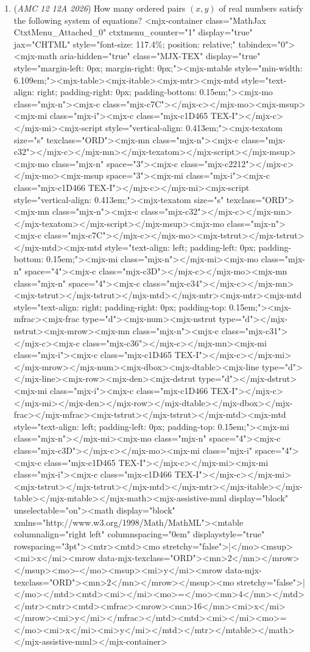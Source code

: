 \begin{enumerate}
	\item (\textit{AMC 12 12A 2026}) How many ordered pairs $(x,y)$ of real numbers satisfy the following system of equations?
<mjx-container class="MathJax CtxtMenu\_Attached\_0" ctxtmenu\_counter="1" display="true" jax="CHTML" style="font-size: 117.4\%; position: relative;" tabindex="0"><mjx-math aria-hidden="true" class="MJX-TEX" display="true" style="margin-left: 0px; margin-right: 0px;"><mjx-mtable style="min-width: 6.109em;"><mjx-table><mjx-itable><mjx-mtr><mjx-mtd style="text-align: right; padding-right: 0px; padding-bottom: 0.15em;"><mjx-mo class="mjx-n"><mjx-c class="mjx-c7C"></mjx-c></mjx-mo><mjx-msup><mjx-mi class="mjx-i"><mjx-c class="mjx-c1D465 TEX-I"></mjx-c></mjx-mi><mjx-script style="vertical-align: 0.413em;"><mjx-texatom size="s" texclass="ORD"><mjx-mn class="mjx-n"><mjx-c class="mjx-c32"></mjx-c></mjx-mn></mjx-texatom></mjx-script></mjx-msup><mjx-mo class="mjx-n" space="3"><mjx-c class="mjx-c2212"></mjx-c></mjx-mo><mjx-msup space="3"><mjx-mi class="mjx-i"><mjx-c class="mjx-c1D466 TEX-I"></mjx-c></mjx-mi><mjx-script style="vertical-align: 0.413em;"><mjx-texatom size="s" texclass="ORD"><mjx-mn class="mjx-n"><mjx-c class="mjx-c32"></mjx-c></mjx-mn></mjx-texatom></mjx-script></mjx-msup><mjx-mo class="mjx-n"><mjx-c class="mjx-c7C"></mjx-c></mjx-mo><mjx-tstrut></mjx-tstrut></mjx-mtd><mjx-mtd style="text-align: left; padding-left: 0px; padding-bottom: 0.15em;"><mjx-mi class="mjx-n"></mjx-mi><mjx-mo class="mjx-n" space="4"><mjx-c class="mjx-c3D"></mjx-c></mjx-mo><mjx-mn class="mjx-n" space="4"><mjx-c class="mjx-c34"></mjx-c></mjx-mn><mjx-tstrut></mjx-tstrut></mjx-mtd></mjx-mtr><mjx-mtr><mjx-mtd style="text-align: right; padding-right: 0px; padding-top: 0.15em;"><mjx-mfrac><mjx-frac type="d"><mjx-num><mjx-nstrut type="d"></mjx-nstrut><mjx-mrow><mjx-mn class="mjx-n"><mjx-c class="mjx-c31"></mjx-c><mjx-c class="mjx-c36"></mjx-c></mjx-mn><mjx-mi class="mjx-i"><mjx-c class="mjx-c1D465 TEX-I"></mjx-c></mjx-mi></mjx-mrow></mjx-num><mjx-dbox><mjx-dtable><mjx-line type="d"></mjx-line><mjx-row><mjx-den><mjx-dstrut type="d"></mjx-dstrut><mjx-mi class="mjx-i"><mjx-c class="mjx-c1D466 TEX-I"></mjx-c></mjx-mi></mjx-den></mjx-row></mjx-dtable></mjx-dbox></mjx-frac></mjx-mfrac><mjx-tstrut></mjx-tstrut></mjx-mtd><mjx-mtd style="text-align: left; padding-left: 0px; padding-top: 0.15em;"><mjx-mi class="mjx-n"></mjx-mi><mjx-mo class="mjx-n" space="4"><mjx-c class="mjx-c3D"></mjx-c></mjx-mo><mjx-mi class="mjx-i" space="4"><mjx-c class="mjx-c1D465 TEX-I"></mjx-c></mjx-mi><mjx-mi class="mjx-i"><mjx-c class="mjx-c1D466 TEX-I"></mjx-c></mjx-mi><mjx-tstrut></mjx-tstrut></mjx-mtd></mjx-mtr></mjx-itable></mjx-table></mjx-mtable></mjx-math><mjx-assistive-mml display="block" unselectable="on"><math display="block" xmlns="http://www.w3.org/1998/Math/MathML"><mtable columnalign="right left" columnspacing="0em" displaystyle="true" rowspacing="3pt"><mtr><mtd><mo stretchy="false">|</mo><msup><mi>x</mi><mrow data-mjx-texclass="ORD"><mn>2</mn></mrow></msup><mo>-</mo><msup><mi>y</mi><mrow data-mjx-texclass="ORD"><mn>2</mn></mrow></msup><mo stretchy="false">|</mo></mtd><mtd><mi></mi><mo>=</mo><mn>4</mn></mtd></mtr><mtr><mtd><mfrac><mrow><mn>16</mn><mi>x</mi></mrow><mi>y</mi></mfrac></mtd><mtd><mi></mi><mo>=</mo><mi>x</mi><mi>y</mi></mtd></mtr></mtable></math></mjx-assistive-mml></mjx-container>

\end{enumerate}
